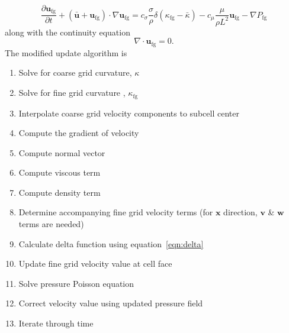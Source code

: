 \begin{equation}
\frac{\partial \bm{u}_{\text{fg}}}{\partial t} +
(\bar{\bm{u}}+\bm{u}_{\text{fg}}) \cdot \nabla \bm{u}_{\text{fg}} = 
c_{\sigma}\frac{\sigma}{\rho}\delta(\kappa_{\text{fg}}-\bar{\kappa})- 
c_{\mu}\frac{\mu}{\rho L^2}\bm{u}_{\text{fg}} -
\nabla P_{\text{fg}}\nonumber
\label{eqn:MyEq}
\end{equation}
along with the continuity equation
\begin{equation}
\nabla\cdot\bm{u}_\text{fg}=0.
\end{equation}
The modified update algorithm is 
\begin{enumerate}
	\item Solve for coarse grid curvature, $\kappa$
	\item Solve for fine grid curvature , $\kappa_{\text{fg}}$
	\item Interpolate coarse grid velocity components to subcell center
	\item Compute the gradient of velocity
	\item Compute normal vector 
	\item Compute viscous term 
	\item Compute density term
	\item Determine accompanying fine grid velocity terms (for $\bm{x}$ direction, $\bm{v}$ \& $\bm{w}$ terms are needed) 
	\item Calculate delta function using equation~\ref{eqn:delta}
	\item Update fine grid velocity value at cell face
	\item Solve pressure Poisson equation 
	\item Correct velocity value using updated pressure field 
	\item Iterate through time
\end{enumerate}

